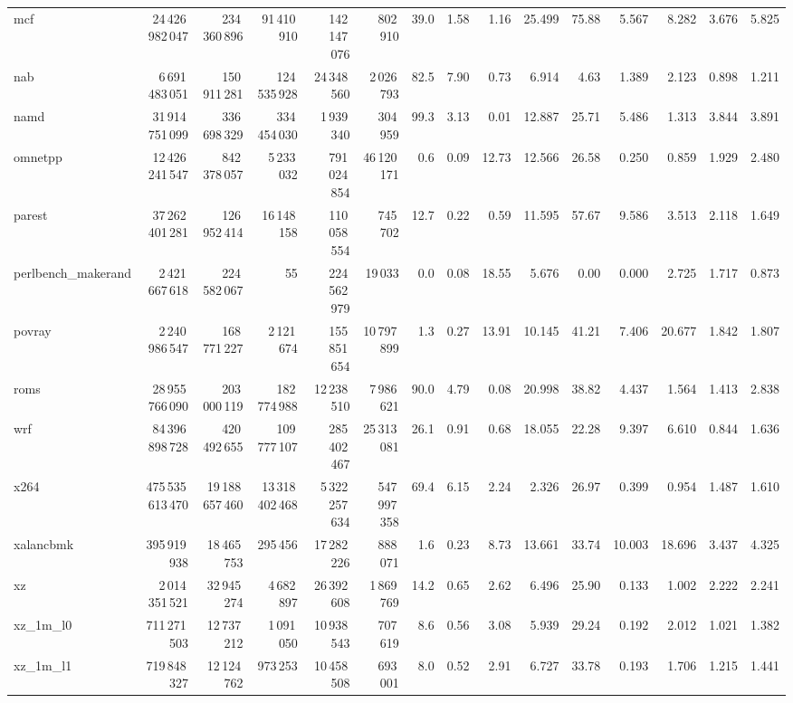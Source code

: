 \documentclass[9pt,landscape,a4paper]{article}
\begin{document}
{\begin{tabular}{lrrrrrrrrrrrrrr}
mcf & 24\,426\,982\,047 & 234\,360\,896 & 91\,410\,910 & 142\,147\,076 & 802\,910 & 39.0 & 1.58 & 1.16 & 25.499 & 75.88 & 5.567 & 8.282 & 3.676 & 5.825 \\
nab & 6\,691\,483\,051 & 150\,911\,281 & 124\,535\,928 & 24\,348\,560 & 2\,026\,793 & 82.5 & 7.90 & 0.73 & 6.914 & 4.63 & 1.389 & 2.123 & 0.898 & 1.211 \\
namd & 31\,914\,751\,099 & 336\,698\,329 & 334\,454\,030 & 1\,939\,340 & 304\,959 & 99.3 & 3.13 & 0.01 & 12.887 & 25.71 & 5.486 & 1.313 & 3.844 & 3.891 \\
omnetpp & 12\,426\,241\,547 & 842\,378\,057 & 5\,233\,032 & 791\,024\,854 & 46\,120\,171 & 0.6 & 0.09 & 12.73 & 12.566 & 26.58 & 0.250 & 0.859 & 1.929 & 2.480 \\
parest & 37\,262\,401\,281 & 126\,952\,414 & 16\,148\,158 & 110\,058\,554 & 745\,702 & 12.7 & 0.22 & 0.59 & 11.595 & 57.67 & 9.586 & 3.513 & 2.118 & 1.649 \\
perlbench\_makerand & 2\,421\,667\,618 & 224\,582\,067 & 55 & 224\,562\,979 & 19\,033 & 0.0 & 0.08 & 18.55 & 5.676 & 0.00 & 0.000 & 2.725 & 1.717 & 0.873 \\
povray & 2\,240\,986\,547 & 168\,771\,227 & 2\,121\,674 & 155\,851\,654 & 10\,797\,899 & 1.3 & 0.27 & 13.91 & 10.145 & 41.21 & 7.406 & 20.677 & 1.842 & 1.807 \\
roms & 28\,955\,766\,090 & 203\,000\,119 & 182\,774\,988 & 12\,238\,510 & 7\,986\,621 & 90.0 & 4.79 & 0.08 & 20.998 & 38.82 & 4.437 & 1.564 & 1.413 & 2.838 \\
wrf & 84\,396\,898\,728 & 420\,492\,655 & 109\,777\,107 & 285\,402\,467 & 25\,313\,081 & 26.1 & 0.91 & 0.68 & 18.055 & 22.28 & 9.397 & 6.610 & 0.844 & 1.636 \\
x264 & 475\,535\,613\,470 & 19\,188\,657\,460 & 13\,318\,402\,468 & 5\,322\,257\,634 & 547\,997\,358 & 69.4 & 6.15 & 2.24 & 2.326 & 26.97 & 0.399 & 0.954 & 1.487 & 1.610 \\
xalancbmk & 395\,919\,938 & 18\,465\,753 & 295\,456 & 17\,282\,226 & 888\,071 & 1.6 & 0.23 & 8.73 & 13.661 & 33.74 & 10.003 & 18.696 & 3.437 & 4.325 \\
xz & 2\,014\,351\,521 & 32\,945\,274 & 4\,682\,897 & 26\,392\,608 & 1\,869\,769 & 14.2 & 0.65 & 2.62 & 6.496 & 25.90 & 0.133 & 1.002 & 2.222 & 2.241 \\
xz\_1m\_l0 & 711\,271\,503 & 12\,737\,212 & 1\,091\,050 & 10\,938\,543 & 707\,619 & 8.6 & 0.56 & 3.08 & 5.939 & 29.24 & 0.192 & 2.012 & 1.021 & 1.382 \\
xz\_1m\_l1 & 719\,848\,327 & 12\,124\,762 & 973\,253 & 10\,458\,508 & 693\,001 & 8.0 & 0.52 & 2.91 & 6.727 & 33.78 & 0.193 & 1.706 & 1.215 & 1.441 \\

\end{tabular}}
\end{document}
